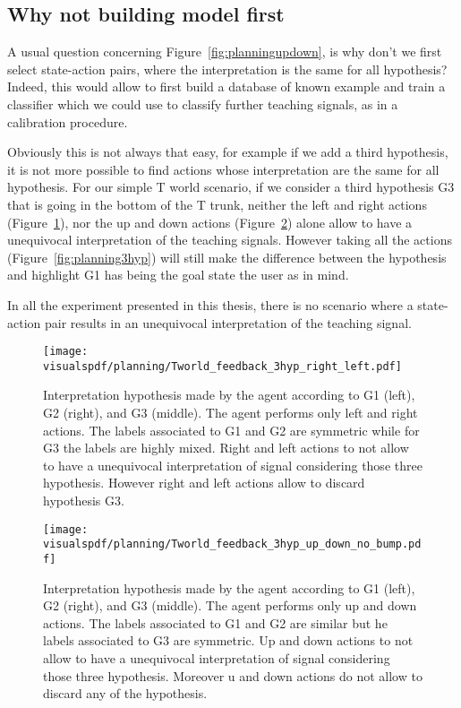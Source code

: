 \subsection{Why not building model first}

A usual question concerning Figure~\ref{fig:planningupdown}, is why don't we first select state-action pairs, where the interpretation is the same for all hypothesis? Indeed, this would allow to first build a database of known example and train a classifier which we could use to classify further teaching signals, as in a calibration procedure.

Obviously this is not always that easy, for example if we add a third hypothesis, it is not more possible to find actions whose interpretation are the same for all hypothesis. For our simple T world scenario, if we consider a third hypothesis G3 that is going in the bottom of the T trunk, neither the left and right actions (Figure~\ref{fig:planning3hyprightleft}), nor the up and down actions (Figure~\ref{fig:planning3hypupdown}) alone allow to have a unequivocal interpretation of the teaching signals. However taking all the actions (Figure~\ref{fig:planning3hyp}) will still make the difference between the hypothesis and highlight G1 has being the goal state the user as in mind.

In all the experiment presented in this thesis, there is no scenario where a state-action pair results in an unequivocal interpretation of the teaching signal. 

\begin{figure}[!htbp]
  \centering
  \texttt{[image: \\visualspdf/planning/Tworld\_feedback\_3hyp\_right\_left.pdf]}
  \caption{Interpretation hypothesis made by the agent according to G1 (left), G2 (right), and G3 (middle). The agent performs only left and right actions. The labels associated to G1 and G2 are symmetric while for G3 the labels are highly mixed. Right and left actions to not allow to have a unequivocal interpretation of signal considering those three hypothesis. However right and left actions allow to discard hypothesis G3.}
  \label{fig:planning3hyprightleft}
\end{figure}

\begin{figure}[!htbp]
  \centering
  \texttt{[image: \\visualspdf/planning/Tworld\_feedback\_3hyp\_up\_down\_no\_bump.pdf]}
  \caption{Interpretation hypothesis made by the agent according to G1 (left), G2 (right), and G3 (middle). The agent performs only up and down actions. The labels associated to G1 and G2 are similar but he labels associated to G3 are symmetric. Up and down actions to not allow to have a unequivocal interpretation of signal considering those three hypothesis. Moreover u and down actions do not allow to discard any of the hypothesis.}
  \label{fig:planning3hypupdown}
\end{figure}

